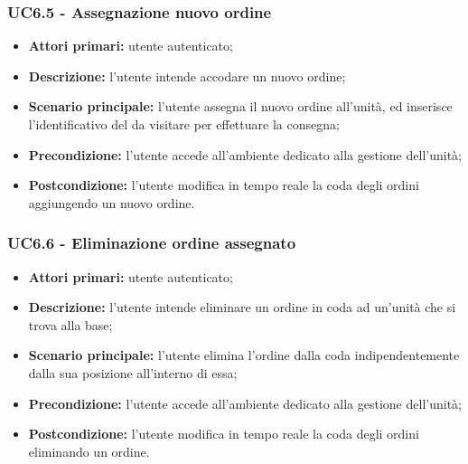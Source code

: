         \subsubsection{UC6.5 - Assegnazione nuovo ordine}
        \begin{itemize}
            \item \textbf{Attori primari:} utente autenticato;
            \item \textbf{Descrizione:} l'utente intende accodare un nuovo ordine;
            \item \textbf{Scenario principale:} l'utente assegna il nuovo ordine all'unità, ed inserisce l'identificativo del  da visitare per effettuare la consegna;
            \item \textbf{Precondizione:} l'utente accede all'ambiente dedicato alla gestione dell'unità;
            \item \textbf{Postcondizione:} l'utente modifica in tempo reale la coda degli ordini aggiungendo un nuovo ordine.
        \end{itemize}

        \subsubsection{UC6.6 - Eliminazione ordine assegnato}
        \begin{itemize}
            \item \textbf{Attori primari:} utente autenticato;
            \item \textbf{Descrizione:} l'utente intende eliminare un ordine in coda ad un'unità che si trova alla base;
            \item \textbf{Scenario principale:} l'utente elimina l'ordine dalla coda indipendentemente dalla sua posizione all'interno di essa;
            \item \textbf{Precondizione:} l'utente accede all'ambiente dedicato alla gestione dell'unità;
            \item \textbf{Postcondizione:} l'utente modifica in tempo reale la coda degli ordini eliminando un ordine.
        \end{itemize}
